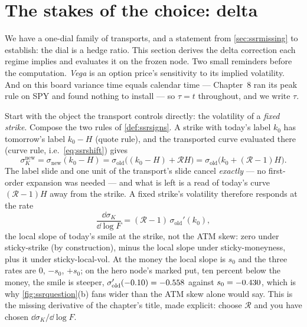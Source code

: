 \section{The stakes of the choice: delta}
\label{sec:ssrdelta}

We have a one-dial family of transports, and a statement from
\cref{sec:ssrmissing} to establish: the dial is a hedge ratio.  This
section derives the delta correction each regime implies and evaluates
it on the frozen node.  Two small reminders before the computation.
\emph{Vega} is an option price's sensitivity to its implied
volatility.  And on this board variance time equals calendar time ---
Chapter~8 ran its peak rule on SPY and found nothing to install ---
so $\tau=t$ throughout, and we write $\tau$.

Start with the object the transport controls directly: the volatility
of a \emph{fixed strike}.  Compose the two rules of
\cref{def:ssrsigns}.  A strike with today's label $k_{0}$ has
tomorrow's label $k_{0}-H$ (quote rule), and the transported curve
evaluated there (curve rule, i.e.\ \eqref{eq:ssrshift}) gives
\begin{equation}
\sigma_{K}^{\mathrm{new}}
=\sigma_{\mathrm{new}}(k_{0}-H)
=\sigma_{\mathrm{old}}\big((k_{0}-H)+\mathcal{R}H\big)
=\sigma_{\mathrm{old}}\big(k_{0}+(\mathcal{R}-1)H\big) .
\label{eq:ssrstrike}
\end{equation}
The label slide and one unit of the transport's slide cancel
\emph{exactly} --- no first-order expansion was needed --- and what is
left is a read of today's curve $(\mathcal{R}-1)H$ away from the
strike.  A fixed strike's volatility therefore responds at the rate
\begin{equation}
\frac{\dd\sigma_K}{\dd\log F}=(\mathcal{R}-1)\,\sigma_{\mathrm{old}}'(k_0),
\label{eq:ssrstrikerate}
\end{equation}
the local slope of today's smile at the strike, not the ATM skew:
zero under sticky-strike (by construction), minus the local slope
under sticky-moneyness, plus it under sticky-local-vol.  At the money
the local slope is $s_0$ and the three rates are $0$, $-s_0$, $+s_0$;
on the hero node's marked put, ten percent below the money, the
smile is steeper, $\sigma_{\mathrm{old}}'(-0.10)=-0.558$
against $s_0=-0.430$, which is why \cref{fig:ssrquestion}(b)
fans wider than the ATM skew alone would say.  This is the missing
derivative of the chapter's title, made explicit: choose
$\mathcal{R}$ and you have chosen $\dd\sigma_K/\dd\log F$.

